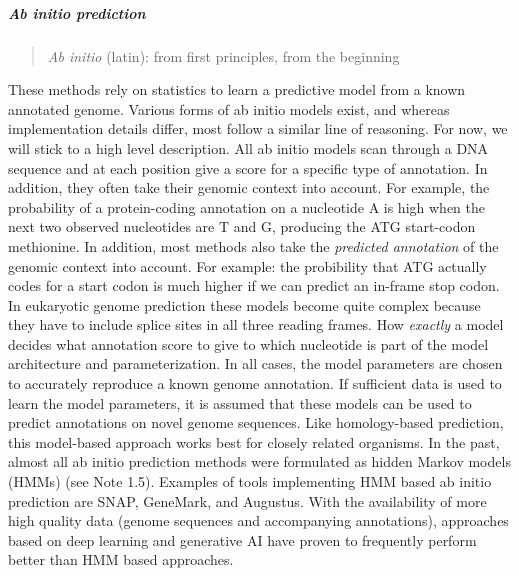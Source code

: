 \subparagraph{Ab initio prediction}

\begin{quote}
\textit{Ab initio} (latin): from first principles, from the beginning
\end{quote}

These methods rely on statistics to learn a predictive model from a known annotated genome.
Various forms of ab initio models exist, and whereas implementation details differ, most follow a similar line of reasoning.
For now, we will stick to a high level description.
All ab initio models scan through a DNA sequence and at each position give a score for a specific type of annotation.
In addition, they often take their genomic context into account.
For example, the probability of a protein-coding annotation on a nucleotide A is high when the next two observed nucleotides are T and G, producing the ATG start-codon methionine.
In addition, most methods also take the \textit{predicted annotation} of the genomic context into account.
For example: the probibility that ATG actually codes for a start codon is much higher if we can predict an in-frame stop codon.
In eukaryotic genome prediction these models become quite complex because they have to include splice sites in all three reading frames.
How \textit{exactly} a model decides what annotation score to give to which nucleotide is part of the model architecture and parameterization.
In all cases, the model parameters are chosen to accurately reproduce a known genome annotation.
If sufficient data is used to learn the model parameters, it is assumed that these models can be used to predict annotations on novel genome sequences.
Like homology-based prediction, this model-based approach works best for closely related organisms. In the past, almost all ab initio prediction methods were formulated as hidden Markov models (HMMs) (see Note 1.5). Examples of tools implementing HMM based ab initio prediction are SNAP, GeneMark, and Augustus. With the availability of more high quality data (genome sequences and accompanying annotations), approaches based on deep learning and generative AI have proven to frequently perform better than HMM based approaches.

